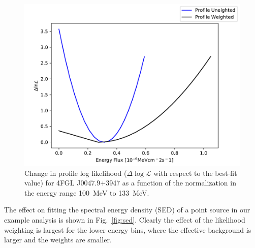 \documentclass[preprint]{aastex}
\begin{document}
\begin{figure}[h]  
\begin{centering}
\includegraphics[width=\columnwidth]{figures/ll_compare.pdf}
\vspace{-0.10in}
\caption{\label{fig:ll}Change in profile log likelihood ($\Delta\log\mathcal{L}$ with 
  respect to the best-fit value) for 4FGL J0047.9+3947 as a function of the 
  normalization in the energy range 100~MeV to 133~MeV.}
\end{centering}
\end{figure}

The effect on fitting the spectral energy density (SED) of a point 
source in our example analysis is shown in Fig.~\ref{fig:sed}.  Clearly 
the effect of the likelihood weighting is largest for the lower energy bins, 
where the effective background is larger and the
weights are smaller.
\end{document}
